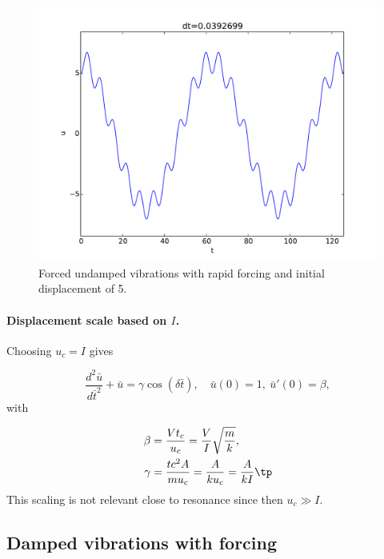 \documentclass[graybox,envcountchap,sectrefs,final]{svmonodo}
\begin{document}
\begin{figure}[!ht]  %
  \centerline{\includegraphics[width=1.0\linewidth]{fig-scaling/vib_delta10_b0_a5_Fcos.pdf}}
  \caption{
  Forced undamped vibrations with rapid forcing and initial displacement of 5. \label{sec:scale:vib:fig:Fcos_b0:4}
  }
\end{figure}




\paragraph{Displacement scale based on $I$.}
Choosing $u_c=I$ gives

\begin{equation}
\frac{d^2\bar u}{d\bar t^2} + \bar u =
\gamma\cos(\delta\bar t),
\quad \bar u(0)=1,\ \bar u'(0)=\beta,
\label{sec:scale:vib:undamped:F:model:scaled5}
\end{equation}
with

\begin{align}
\beta  &= \frac{Vt_c}{u_c} = \frac{V}{I}\sqrt{\frac{m}{k}},\\ 
\gamma & = \frac{tc^2A}{mu_c} = \frac{A}{ku_c} = \frac{A}{kI} \tp
\end{align}
This scaling is not relevant close to resonance since then $u_c\gg I$.


\subsection{Damped vibrations with forcing}
\label{sec:scale:vib:damped:F}
\end{document}
